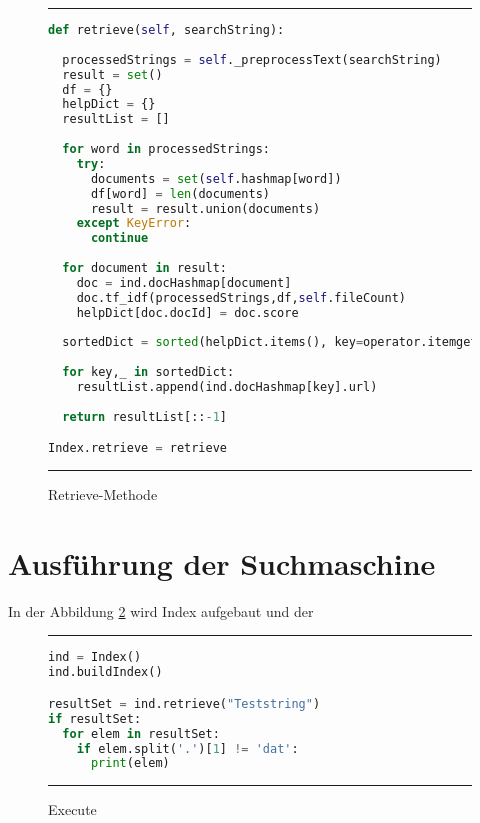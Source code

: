 \begin{figure}[h]
	\rule{\textwidth}{0.4pt}
		\begin{lstlisting}[language=Python]
def retrieve(self, searchString):
 
  processedStrings = self._preprocessText(searchString)
  result = set()
  df = {}
  helpDict = {}
  resultList = []
    
  for word in processedStrings:
    try:
      documents = set(self.hashmap[word])
      df[word] = len(documents)
      result = result.union(documents)
    except KeyError:
      continue
    
  for document in result:
    doc = ind.docHashmap[document]
    doc.tf_idf(processedStrings,df,self.fileCount)
    helpDict[doc.docId] = doc.score
        
  sortedDict = sorted(helpDict.items(), key=operator.itemgetter(1))
    
  for key,_ in sortedDict:
    resultList.append(ind.docHashmap[key].url)
        
  return resultList[::-1]

Index.retrieve = retrieve
		\end{lstlisting}
	\rule{\textwidth}{0.4pt}
	\caption{Retrieve-Methode}
	\label{fig:retrieve}
\end{figure}

\section{Ausführung der Suchmaschine}

In der Abbildung \ref{fig:execute} wird Index aufgebaut und der

\begin{figure}[h]
	\rule{\textwidth}{0.4pt}
		\begin{lstlisting}[language=Python]
ind = Index()
ind.buildIndex()

resultSet = ind.retrieve("Teststring")
if resultSet:
  for elem in resultSet:
    if elem.split('.')[1] != 'dat':
      print(elem)
		\end{lstlisting}
	\rule{\textwidth}{0.4pt}
	\caption{Execute}
	\label{fig:execute}
\end{figure}